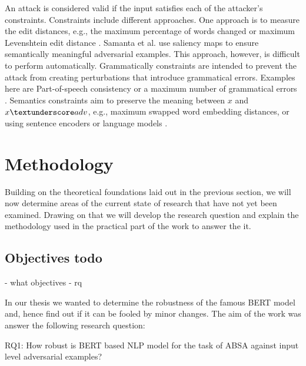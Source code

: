     An attack is considered valid if the input satisfies each of the attacker's constraints. 
    Constraints include different approaches. One approach is to measure the edit distances, e.g., the maximum percentage of words changed \cite{ebrahimi2017hotflip} or maximum Levenshtein edit distance \cite{gao2018black}. Samanta et al. use saliency maps to ensure semantically meaningful adversarial examples\cite{samanta2017towards}. This approach, however, is difficult to perform automatically. Grammatically constraints are intended to prevent the attack from creating perturbations that introduce grammatical errors. Examples here are Part-of-speech consistency or a maximum number of grammatical errors \cite{ebrahimi2017hotflip, jin2019bert}. Semantics constraints aim to preserve the meaning between $x$ and $x\textunderscore adv$, e.g., maximum swapped word embedding distances, or using sentence encoders or language models \cite{cer2018universal, garg2020bae, jin2019bert, li2018textbugger, alzantot2018generating, ebrahimi2017hotflip}.



\section{Methodology}
\label{sec:methodology}

Building on the theoretical foundations laid out in the previous section, we will now determine areas of the current state of research that have not yet been examined. Drawing on that we will develop the research question and explain the methodology used in the practical part of the work to answer the it. 


\subsection{Objectives todo}
\label{sec:objectives}
- what objectives
- rq

In our thesis we wanted to determine the robustness of the famous BERT model and, hence find out if it can be fooled by minor changes. The aim of the work was answer the following research question:

RQ1: How robust is BERT based NLP model for the task of ABSA against input level adversarial examples?

